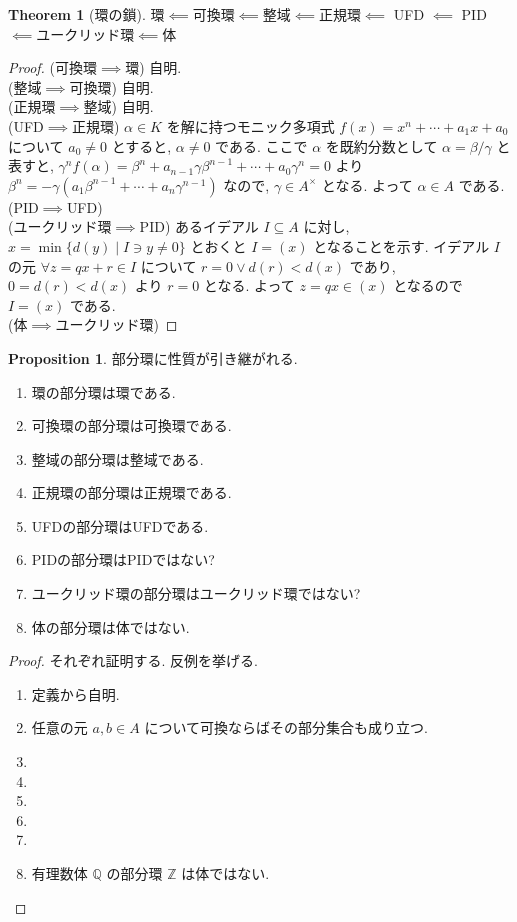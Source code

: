 \documentclass[a4paper,dvipdfmx]{jsarticle}
\theoremstyle{plain}
\theoremstyle{definition}
\theoremstyle{plain}
\numberwithin{equation}{section}
\numberwithin{theorem}{section}
\numberwithin{definition}{section}
\numberwithin{note}{section}
\theoremstyle{definition}
\newtheorem{prop}[dfn]{Proposition}
\newtheorem{thm}[dfn]{Theorem}
\begin{document}
\begin{thm}[環の鎖]
  環$\impliedby$可換環$\impliedby$整域$\impliedby$正規環$\impliedby$ UFD $\impliedby$ PID $\impliedby$ユークリッド環$\impliedby$体
\end{thm}
\begin{proof}
  (可換環$\implies$環) 自明. \\
  (整域$\implies$可換環) 自明. \\
  (正規環$\implies$整域) 自明. \\
  (UFD$\implies$正規環) $\alpha\in K$ を解に持つモニック多項式 $f(x) = x^n+\cdots+a_1x + a_0$ について $a_0 \neq 0$ とすると, $\alpha \neq 0$ である. ここで $\alpha$ を既約分数として $\alpha = \beta/\gamma$ と表すと, $\gamma^nf(\alpha) = \beta^n + a_{n-1}\gamma\beta^{n-1} + \cdots + a_0\gamma^n = 0$ より $\beta^n = -\gamma(a_1\beta^{n-1} + \cdots + a_n\gamma^{n-1})$ なので, $\gamma\in A^\times$ となる. よって $\alpha\in A$ である. \\
  (PID$\implies$UFD) \\
  (ユークリッド環$\implies$PID) あるイデアル $I\subseteq A$ に対し, $x = \min\lbrace d(y)\mid I\ni y \neq 0\rbrace$ とおくと $I = (x)$ となることを示す. イデアル $I$ の元 $\forall z=qx+r\in I$ について $r=0\lor d(r)<d(x)$ であり, $0 = d(r) < d(x)$ より $r = 0$ となる. よって $z = qx \in (x)$ となるので $I = (x)$ である. \\
  (体$\implies$ユークリッド環)

\end{proof}


\begin{prop}
  部分環に性質が引き継がれる.
  \begin{enumerate}
    \item 環の部分環は環である.
    \item 可換環の部分環は可換環である.
    \item 整域の部分環は整域である.
    \item 正規環の部分環は正規環である.
    \item UFDの部分環はUFDである.
    \item PIDの部分環はPIDではない?
    \item ユークリッド環の部分環はユークリッド環ではない?
    \item 体の部分環は体ではない.
  \end{enumerate}
\end{prop}
\begin{proof}
  それぞれ証明する. 反例を挙げる.
  \begin{enumerate}
    \item 定義から自明.
    \item 任意の元 $a,b\in A$ について可換ならばその部分集合も成り立つ.
    \item
    \item
    \item
    \item
    \item
    \item 有理数体 $\mathbb{Q}$ の部分環 $\mathbb{Z}$ は体ではない.
  \end{enumerate}
\end{proof}
\end{document}
